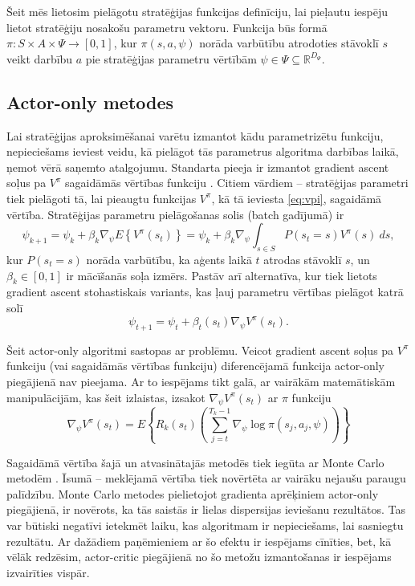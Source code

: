 \documentclass{ludis} %
\begin{document}
Šeit mēs lietosim pielāgotu stratēģijas funkcijas definīciju, lai pieļautu iespēju lietot stratēģiju nosakošu parametru vektoru. Funkcija būs formā $\pi: S \times A \times \Psi \rightarrow [0,1]$, kur $\pi(s, a, \psi)$ norāda varbūtību atrodoties stāvoklī $s$ veikt darbību $a$ pie stratēģijas parametru vērtībām $\psi \in \Psi \subseteq \mathbb{R}^{D_\Psi}$.

\subsection{Actor-only metodes}
 
Lai stratēģijas aproksimēšanai varētu izmantot kādu parametrizētu funkciju, nepieciešams ieviest veidu, kā pielāgot tās parametrus algoritma darbības laikā, ņemot vērā saņemto atalgojumu.
Standarta pieeja ir izmantot gradient ascent soļus pa $V^\pi$ sagaidāmās vērtības funkciju \autocite{williams1992simple} \autocite{sutton2000policy} \autocite{Hasselt2012}.
Citiem vārdiem -- stratēģijas parametri tiek pielāgoti tā, lai pieaugtu funkcijas $V^\pi$, kā tā ieviesta \eqref{eq:vpi}, sagaidāmā vērtība.
Stratēģijas parametru pielāgošanas solis (batch gadījumā) ir
\[
	\psi_{k+1} = \psi_k + \beta_k \nabla_\psi E \left\{V^\pi(s_t)\right\} = \psi_k + \beta_k \nabla_\psi \int_{s \in S} P(s_t = s) V^\pi(s)\ ds,
\]
kur $P(s_t = s)$ norāda varbūtību, ka aģents laikā $t$ atrodas stāvoklī $s$, un $\beta_k \in [0,1]$ ir mācīšanās soļa izmērs.
Pastāv arī alternatīva, kur tiek lietots gradient ascent stohastiskais variants, kas ļauj parametru vērtības pielāgot katrā solī
\begin{equation} \label{eq:stohgrad}
	\psi_{t+1} = \psi_t + \beta_t(s_t) \nabla_\psi V^\pi(s_t).
\end{equation}

Šeit actor-only algoritmi sastopas ar problēmu. Veicot gradient ascent soļus pa $V^\pi$ funkciju (vai sagaidāmās vērtības funkciju) diferencējamā funkcija actor-only piegājienā nav pieejama.
Ar to iespējams tikt galā, ar vairākām matemātiskām manipulācijām, kas šeit izlaistas, izsakot $\nabla_\psi V^\pi(s_t)$ ar $\pi$ funkciju
\begin{equation} \label{eq:nablav}
	\nabla_\psi V^\pi(s_t) = E \left\{R_k(s_t) \left(\sum\limits_{j=t}^{T_k - 1} \nabla_\psi \log \pi(s_j, a_j, \psi) \right) \right\}
\end{equation}

Sagaidāmā vērtība šajā un atvasinātajās metodēs tiek iegūta ar Monte Carlo metodēm \autocite{halton1970retrospective}.
Īsumā -- meklējamā vērtība tiek novērtēta ar vairāku nejaušu paraugu palīdzību.
Monte Carlo metodes pielietojot gradienta aprēķiniem actor-only piegājienā, ir novērots, ka tās saistās ir lielas dispersijas ieviešanu rezultātos.
Tas var būtiski negatīvi ietekmēt laiku, kas algoritmam ir nepieciešams, lai sasniegtu rezultātu.
Ar dažādiem paņēmieniem ar šo efektu ir iespējams cīnīties, bet, kā vēlāk redzēsim, actor-critic piegājienā no šo metožu izmantošanas ir iespējams izvairīties vispār. %
\end{document}
